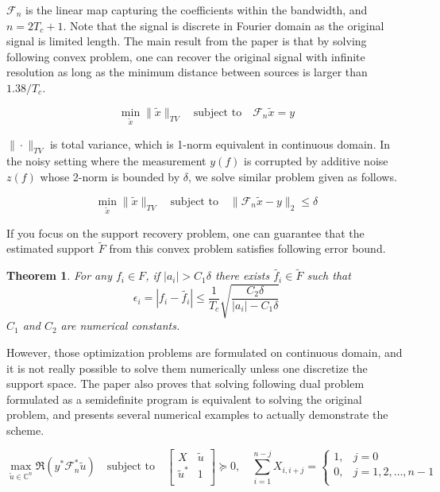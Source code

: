 \documentclass[11pt,journal, onecolumn]{IEEEtran}
\theoremstyle{theorem}
\newtheorem{theorem}{Theorem}
\begin{document}
\noindent $\mathcal{F}_n$ is the linear map capturing the coefficients within the bandwidth, and $n=2T_c+1$. Note that the signal is discrete in Fourier domain as the original signal is limited length. The main result from the paper is that by solving following convex problem, one can recover the original signal with infinite resolution as long as the minimum distance between sources is larger than $1.38/T_c$.  

\begin{equation}
    \min_{ \tilde{x} }{\| \tilde{x} \|_{TV}} \quad \textrm{subject to} \quad \mathcal{F}_n \tilde{x} = y
\end{equation}

\noindent $\|\cdot\|_{TV}$ is total variance, which is 1-norm equivalent in continuous domain. In the noisy setting where the measurement $y(f)$ is corrupted by additive noise $z(f)$ whose 2-norm is bounded by $\delta$, we solve similar problem given as follows. 

\begin{equation}
    \min_{ \tilde{x} }{\| \tilde{x} \|_{TV}} \quad \textrm{subject to} \quad \| \mathcal{F}_n \tilde{x} - y \|_2 \leq \delta
\end{equation}

\noindent If you focus on the support recovery problem, one can guarantee that the estimated support $\widetilde{F}$ from this convex problem satisfies following error bound.

\begin{theorem}
    For any $f_i\in F$, if $|a_i|>C_1\delta$ there exists $\tilde{f_i}\in \widetilde{F}$ such that
    \begin{equation}
        \epsilon_i=|f_i - \tilde{f_i}| \leq \frac{1}{T_c} \sqrt{\frac{C_2 \delta}{|a_i| - C_1 \delta}}
    \label{supportth}
    \end{equation}
    $C_1$ and $C_2$ are numerical constants.
    \label{theorem_support}
\end{theorem}

However, those optimization problems are formulated on continuous domain, and it is not really possible to solve them numerically unless one discretize the support space. The paper also proves that solving following dual problem formulated as a semidefinite program is equivalent to solving the original problem, and presents several numerical examples to actually demonstrate the scheme.

\begin{equation}
    \max_{\tilde{u}\in\mathbb{C}^n} \Re{(y^*\mathcal{F}_n^*\tilde{u})} \quad \textrm{subject to} \quad \left[ 
    \begin{array}{cc}  
        X & \tilde{u}\\
        \tilde{u}^* & 1 \\
    \end{array}
\right] \succeq 0, \quad \sum_{i=1}^{n-j}{X_{i,i+j}}
=\left\{  
    \begin{array}{cl}
        1,& j=0 \\ 
        0,& j=1,2,\ldots,n-1\\
    \end{array}
    \right.
    \label{sdp}
\end{equation}
\end{document}
